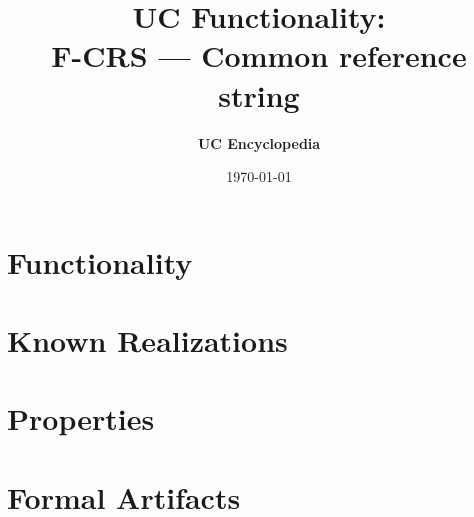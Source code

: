 \documentclass[11pt,a4paper]{article}
\title{\textbf{\Large UC Functionality:}\\[0.2em] \Large F-CRS --- Common reference string}
\author{\textbf{UC Encyclopedia}}
\date{\today}
\newtheorem{functionality}{Functionality}
\begin{document}
\maketitle

\begin{abstract}
\end{abstract}

\section{Functionality}

%

\section{Known Realizations}


\section{Properties}


\section{Formal Artifacts}

\end{document}
